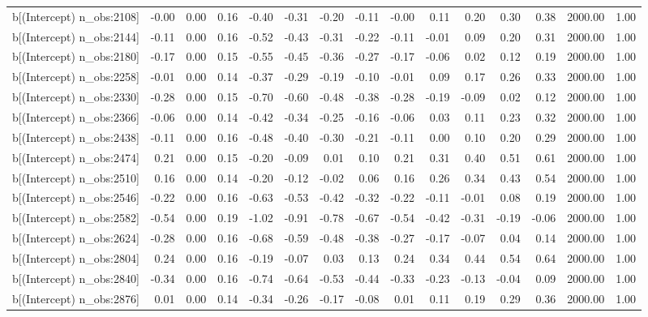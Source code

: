 \begin{table}[ht]
\begin{tabular}{rrrrrrrrrrrrrrr}
  b[(Intercept) n\_obs:2108] & -0.00 & 0.00 & 0.16 & -0.40 & -0.31 & -0.20 & -0.11 & -0.00 & 0.11 & 0.20 & 0.30 & 0.38 & 2000.00 & 1.00 \\ 
  b[(Intercept) n\_obs:2144] & -0.11 & 0.00 & 0.16 & -0.52 & -0.43 & -0.31 & -0.22 & -0.11 & -0.01 & 0.09 & 0.20 & 0.31 & 2000.00 & 1.00 \\ 
  b[(Intercept) n\_obs:2180] & -0.17 & 0.00 & 0.15 & -0.55 & -0.45 & -0.36 & -0.27 & -0.17 & -0.06 & 0.02 & 0.12 & 0.19 & 2000.00 & 1.00 \\ 
  b[(Intercept) n\_obs:2258] & -0.01 & 0.00 & 0.14 & -0.37 & -0.29 & -0.19 & -0.10 & -0.01 & 0.09 & 0.17 & 0.26 & 0.33 & 2000.00 & 1.00 \\ 
  b[(Intercept) n\_obs:2330] & -0.28 & 0.00 & 0.15 & -0.70 & -0.60 & -0.48 & -0.38 & -0.28 & -0.19 & -0.09 & 0.02 & 0.12 & 2000.00 & 1.00 \\ 
  b[(Intercept) n\_obs:2366] & -0.06 & 0.00 & 0.14 & -0.42 & -0.34 & -0.25 & -0.16 & -0.06 & 0.03 & 0.11 & 0.23 & 0.32 & 2000.00 & 1.00 \\ 
  b[(Intercept) n\_obs:2438] & -0.11 & 0.00 & 0.16 & -0.48 & -0.40 & -0.30 & -0.21 & -0.11 & 0.00 & 0.10 & 0.20 & 0.29 & 2000.00 & 1.00 \\ 
  b[(Intercept) n\_obs:2474] & 0.21 & 0.00 & 0.15 & -0.20 & -0.09 & 0.01 & 0.10 & 0.21 & 0.31 & 0.40 & 0.51 & 0.61 & 2000.00 & 1.00 \\ 
  b[(Intercept) n\_obs:2510] & 0.16 & 0.00 & 0.14 & -0.20 & -0.12 & -0.02 & 0.06 & 0.16 & 0.26 & 0.34 & 0.43 & 0.54 & 2000.00 & 1.00 \\ 
  b[(Intercept) n\_obs:2546] & -0.22 & 0.00 & 0.16 & -0.63 & -0.53 & -0.42 & -0.32 & -0.22 & -0.11 & -0.01 & 0.08 & 0.19 & 2000.00 & 1.00 \\ 
  b[(Intercept) n\_obs:2582] & -0.54 & 0.00 & 0.19 & -1.02 & -0.91 & -0.78 & -0.67 & -0.54 & -0.42 & -0.31 & -0.19 & -0.06 & 2000.00 & 1.00 \\ 
  b[(Intercept) n\_obs:2624] & -0.28 & 0.00 & 0.16 & -0.68 & -0.59 & -0.48 & -0.38 & -0.27 & -0.17 & -0.07 & 0.04 & 0.14 & 2000.00 & 1.00 \\ 
  b[(Intercept) n\_obs:2804] & 0.24 & 0.00 & 0.16 & -0.19 & -0.07 & 0.03 & 0.13 & 0.24 & 0.34 & 0.44 & 0.54 & 0.64 & 2000.00 & 1.00 \\ 
  b[(Intercept) n\_obs:2840] & -0.34 & 0.00 & 0.16 & -0.74 & -0.64 & -0.53 & -0.44 & -0.33 & -0.23 & -0.13 & -0.04 & 0.09 & 2000.00 & 1.00 \\ 
  b[(Intercept) n\_obs:2876] & 0.01 & 0.00 & 0.14 & -0.34 & -0.26 & -0.17 & -0.08 & 0.01 & 0.11 & 0.19 & 0.29 & 0.36 & 2000.00 & 1.00 \\ 

\end{tabular}
\end{table}
